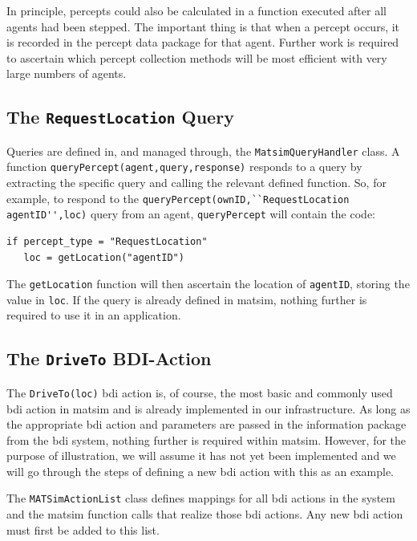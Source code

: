 In principle, percepts could also be calculated in a function 
executed after all agents had been stepped. The important thing is
that when a percept occurs, 
it is recorded in the percept data
package for that agent. Further work is required to ascertain which
percept collection methods will be most efficient with very large
numbers of agents.

\subsection{The \lstinline{RequestLocation} Query}
Queries are defined in, and managed through, the \lstinline{MatsimQueryHandler}
class.
A function \lstinline{queryPercept(agent,query,response)} responds to a query by
extracting the specific query and calling the relevant defined
function. So, for example, to respond to the
\lstinline{queryPercept(ownID,``RequestLocation agentID'',loc)} query from an
agent, \lstinline{queryPercept} will contain the code:
\begin{lstlisting}
if percept_type = "RequestLocation"
   loc = getLocation("agentID")
\end{lstlisting}
The \lstinline{getLocation} function will then ascertain the location of
\lstinline{agentID}, storing the value in \lstinline{loc}. 
%
If the query is already defined in \gls{matsim}, nothing further is required
to use it in an application.

\subsection{The \lstinline{DriveTo} BDI-Action}
The \lstinline{DriveTo(loc)} \gls{bdi} action is, of course, the most basic and
commonly used \gls{bdi} action in \gls{matsim} and is already
implemented in our infrastructure. As long as the appropriate \gls{bdi}
action and parameters are passed in the information package from the
\gls{bdi} system, nothing further is required within \gls{matsim}. However, for
the purpose of illustration, we will assume it has not yet been
implemented and we will go through the steps of defining a new \gls{bdi}
action with this as an example.

The \lstinline{MATSimActionList} class defines mappings for all \gls{bdi}
actions in the system and the \gls{matsim} function calls that realize those
\gls{bdi} actions.  Any new \gls{bdi} action must first be added to this list.

